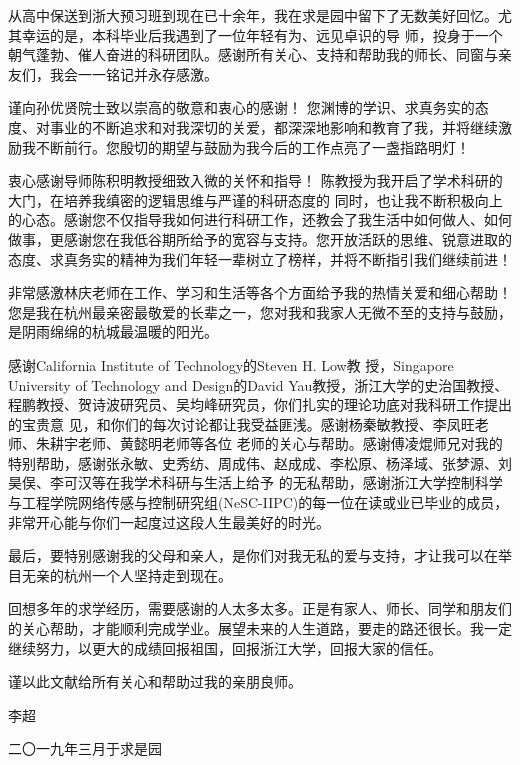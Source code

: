 \begin{thanks}
从高中保送到浙大预习班到现在已十余年，我在求是园中留下了无数美好回忆。尤其幸运的是，本科毕业后我遇到了一位年轻有为、远见卓识的导
师，投身于一个朝气蓬勃、催人奋进的科研团队。感谢所有关心、支持和帮助我的师长、同窗与亲友们，我会一一铭记并永存感激。

谨向孙优贤院士致以崇高的敬意和衷心的感谢！ 您渊博的学识、求真务实的态度、对事业的不断追求和对我深切的关爱，都深深地影响和教育了我，并将继续激励我不断前行。您殷切的期望与鼓励为我今后的工作点亮了一盏指路明灯！

衷心感谢导师陈积明教授细致入微的关怀和指导！ 陈教授为我开启了学术科研的大门，在培养我缜密的逻辑思维与严谨的科研态度的
同时，也让我不断积极向上的心态。感谢您不仅指导我如何进行科研工作，还教会了我生活中如何做人、如何做事，更感谢您在我低谷期所给予的宽容与支持。您开放活跃的思维、锐意进取的态度、求真务实的精神为我们年轻一辈树立了榜样，并将不断指引我们继续前进！

非常感激林庆老师在工作、学习和生活等各个方面给予我的热情关爱和细心帮助！您是我在杭州最亲密最敬爱的长辈之一，您对我和我家人无微不至的支持与鼓励，是阴雨绵绵的杭城最温暖的阳光。

感谢California Institute of Technology的Steven H. Low教
授，Singapore University of Technology and Design的David Yau教授，浙江大学的史治国教授、程鹏教授、贺诗波研究员、吴均峰研究员，你们扎实的理论功底对我科研工作提出的宝贵意
见，和你们的每次讨论都让我受益匪浅。感谢杨秦敏教授、李凤旺老师、朱耕宇老师、黄懿明老师等各位
老师的关心与帮助。感谢傅凌焜师兄对我的特别帮助，感谢张永敏、史秀纺、周成伟、赵成成、李松原、杨泽域、张梦源、刘昊俣、李可汉等在我学术科研与生活上给予
的无私帮助，感谢浙江大学控制科学与工程学院网络传感与控制研究组(NeSC-IIPC)的每一位在读或业已毕业的成员，非常开心能与你们一起度过这段人生最美好的时光。

最后，要特别感谢我的父母和亲人，是你们对我无私的爱与支持，才让我可以在举目无亲的杭州一个人坚持走到现在。


回想多年的求学经历，需要感谢的人太多太多。正是有家人、师长、同学和朋友们的关心帮助，才能顺利完成学业。展望未来的人生道路，要走的路还很长。我一定继续努力，以更大的成绩回报祖国，回报浙江大学，回报大家的信任。

谨以此文献给所有关心和帮助过我的亲朋良师。

	\begin{flushright}
		{李超}
		
		{二〇一九年三月于求是园}
	\end{flushright}
\end{thanks}
